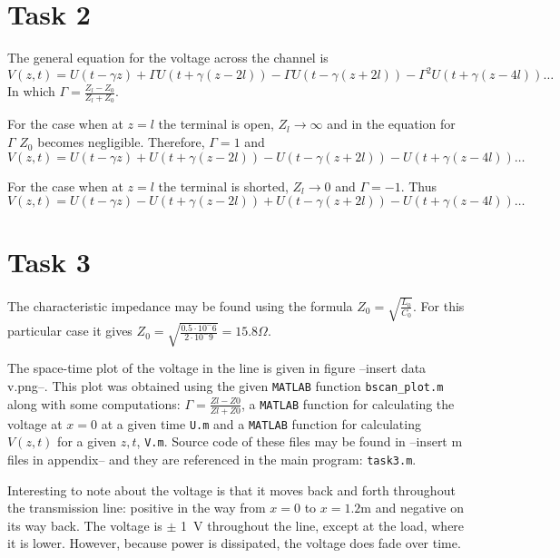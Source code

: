 \documentclass[11pt,titlepage]{report}
\begin{document}
\section{Task 2}
The general equation for the voltage across the channel is 
\begin{equation}
V(z,t)=U(t-\gamma z) + \Gamma U(t+\gamma(z-2l))-\Gamma U(t-\gamma(z+2l))-\Gamma^2U(t+\gamma(z-4l))\dots
\end{equation}
In which $\Gamma=\frac{Z_l-Z_0}{Z_l+Z_0}$.

For the case when at $z=l$ the terminal is open, $Z_l \to \infty$ and in the equation for $\Gamma$ $Z_0$ becomes negligible. Therefore, $\Gamma=1$ and 
\begin{equation}
V(z,t)=U(t-\gamma z) + U(t+\gamma(z-2l))- U(t-\gamma(z+2l))- U(t+\gamma(z-4l))\dots
\end{equation}

For the case when at $z=l$ the terminal is shorted, $Z_l \to 0$ and $\Gamma=-1$. Thus 
\begin{equation}
V(z,t)=U(t-\gamma z) - U(t+\gamma(z-2l))+U(t-\gamma(z+2l))-U(t+\gamma(z-4l))\dots
\end{equation}


\section{Task 3}
The characteristic impedance may be found using the formula $Z_0=\sqrt{\frac{L_0}{C_0}}$. For this particular case it gives $Z_0=\sqrt{\frac{0.5\cdot10^-6}{2\cdot10^-9}}=15.8\Omega$. 

The space-time plot of the voltage in the line is given in figure --insert data v.png--. This plot was obtained using the given \texttt{MATLAB} function \texttt{bscan\_plot.m} along with some computations: $\Gamma=\frac{Zl-Z0}{Zl+Z0}$, a \texttt{MATLAB} function for calculating the voltage at $x=0$ at a given time \texttt{U.m} and a \texttt{MATLAB} function for calculating $V(z,t)$ for a given $z,t$, \texttt{V.m}. Source code of these files may be found in --insert m files in appendix-- and they are referenced in the main program: \texttt{task3.m}.

Interesting to note about the voltage is that it moves back and forth throughout the transmission line: positive in the way from $x=0$ to $x=1.2$m and negative on its way back. The voltage is $\pm$ \SI{1}{V} throughout the line, except at the load, where it is lower. However, because power is dissipated, the voltage does fade over time.
\end{document}
